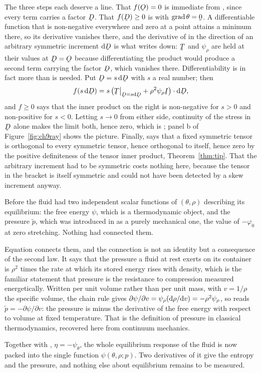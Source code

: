 The three steps each deserve a line. That $f(\Ob)=0$ is immediate from
, since every term carries a factor $\bD$. That $f(\bD)\geq0$
is  with $\grad\theta=\bze$. A differentiable function that is
non-negative everywhere and zero at a point attains a minimum there, so
its derivative vanishes there, and the derivative of  in the
direction of an arbitrary symmetric increment $\dl\bD$ is what
 writes down: $\bT$ and $\psi_{\rho}$ are held at their values
at $\bD=\Ob$ because differentiating the product would produce a second
term carrying the factor $\bD$, which vanishes there. Differentiability
is in fact more than is needed. Put $\bD=s\,\dl\bD$ with $s$ a real
number; then
\[
   f(s\,\dl\bD)=s\,\ip{\big(\bT\rest{\bD=s\dl\bD}
   +\rho^{2}\psi_{\rho}\I\big)}{\dl\bD},
\]
and $f\geq0$ says that the inner product on the right is non-negative
for $s>0$ and non-positive for $s<0$. Letting $s\to0$ from either side,
continuity of the stress in $\bD$ alone makes the limit both, hence zero,
which is ; panel b of Figure~\ref{fig:ch9ray} shows the
picture. Finally,
 says that a fixed symmetric tensor is orthogonal to every
symmetric tensor, hence orthogonal to itself, hence zero by the positive
definiteness of the tensor inner product, Theorem~\ref{thm:tip}. That
the arbitrary increment had to be symmetric costs nothing here,
because the tensor in the bracket is itself symmetric and could not have
been detected by a skew increment anyway.

\begin{remark}\label{rem:ch9thermop}
Before  the fluid had two independent scalar functions of
$(\theta,\rho)$ describing its equilibrium: the free energy $\psi$,
which is a thermodynamic object, and the pressure $\tilde p$, which was
introduced in  as a purely mechanical one, the value of
$-\varphi_{0}$ at zero stretching. Nothing had connected them.

Equation  connects them, and the connection is not an
identity but a consequence of the second law. It says that the pressure
a fluid at rest exerts on its container is $\rho^{2}$ times the rate at
which its stored energy rises with density, which is the familiar
statement that pressure is the resistance to compression measured
energetically. Written per unit volume rather than per unit mass, with
$v=1/\rho$ the specific volume, the chain rule gives
$\partial\psi/\partial v=\psi_{\rho}(\mathrm{d}\rho/\mathrm{d} v)
=-\rho^{2}\psi_{\rho}$, so  reads
$\tilde p=-\partial\psi/\partial v$: the pressure is minus the
derivative of the free energy with respect to volume at fixed
temperature. That is the definition of pressure in classical
thermodynamics, recovered here from continuum mechanics.

Together with , $\eta=-\psi_{\theta}$, the whole equilibrium
response of the fluid is now packed into the single function
$\psi(\theta,\rho;p)$. Two derivatives of it give the entropy and the
pressure, and nothing else about equilibrium remains to be measured.
\end{remark}

